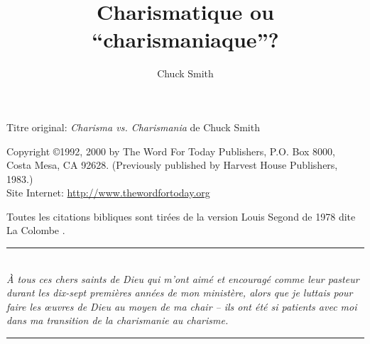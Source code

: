 \documentclass[paper=6.13in:9.21in,pagesize=pdftex,12pt,DIV=calc]{scrbook}
\title{Charismatique ou ``charismaniaque''?}
\author{Chuck Smith}
\begin{document}
\maketitle


\cleardoublepage
Titre original: \emph{Charisma vs. Charismania}
de Chuck Smith

Copyright \copyright 1992, 2000 by The Word For Today Publishers, P.O. Box 8000, \\
Costa Mesa, CA 92628. (Previously published by Harvest House Publishers, 1983.) \\
Site Internet: \url{http://www.thewordfortoday.org}

Toutes les citations bibliques sont tirées de la version Louis Segond de 1978 dite \og La Colombe \fg{}.


\newcommand{\HRule}{\rule{\linewidth}{0.5mm}}
\newpage
\mbox{}
\vfill
\begin{center}
\HRule \\[0.4cm]
\emph{À tous ces chers saints de Dieu qui m'ont aimé et encouragé comme leur pasteur durant les dix-sept premières années de mon ministère, alors que je luttais pour faire les œuvres de Dieu au moyen de ma chair -- ils ont été si patients avec moi dans ma transition de la charismanie au charisme.}
\HRule \\[1.5cm]
\end{center}
\vfill
\mbox{}
\newpage



\tableofcontents








\printindex
\end{document}
